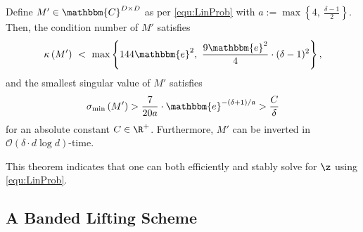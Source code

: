 \begin{thm}
Define $M' \in \mathbbm{C}^{D \times D}$ as per \eqref{equ:LinProb} with
$a:= \max \left\{ 4,~\frac{\delta - 1}{2} \right\}$.  Then, the
condition number of $M'$ satisfies 
%
$$\kappa \left( M' \right) ~<~ \max
\left\{ 144 \mathbbm{e}^2,~\frac{9 \mathbbm{e}^2}{4} \cdot (\delta -
1)^2 \right \},$$
%
and the smallest singular value of $M'$ satisfies
%
$$\sigma_{\rm min} \left( M' \right) > \frac{7}{20 a} \cdot \mathbbm{e}^{-(\delta + 1)/a} > \frac{C}{\delta}$$
%
for an absolute constant $C \in \R^+$.  Furthermore, $M'$ can be
inverted in $\mathcal{O} \left( \delta \cdot d \log d \right)$-time.
\label{thm:WellCondMeas}
\end{thm}

This theorem indicates that one can both efficiently and stably
solve for $\z$ using \eqref{equ:LinProb}.  

\subsection{A Banded Lifting Scheme}
\label{sec:LiftToBandedMatrix}

